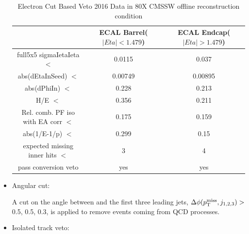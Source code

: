 \begin{itemize}
\begin{table}[htbp]
\fontsize{10 pt}{1.2 em}
\selectfont
\begin{centering}
\caption{\label{tab:ElectronCutBasedVeto} Electron Cut Based Veto 2016 Data in 80X CMSSW offline reconstruction condition}
\hspace*{-4ex}
\begin{lrbox}{\closureBox}
\begin{tabular}{|c|c|c|}
\hline
                                     & ECAL Barrel($|Eta|<1.479$) & ECAL Endcap($|Eta|>1.479$) \\
\hline
  full5x5 sigmaIetaIeta $<$          & 0.0115                     & 0.037                    \\
\hline
  abs(dEtaInSeed) $<$                & 0.00749                    & 0.00895                  \\
\hline
  abs(dPhiIn) $<$	             & 0.228                      & 0.213                    \\
\hline
  H/E $<$	                     & 0.356                      & 0.211                    \\
\hline
  Rel. comb. PF iso with EA corr $<$ & 0.175                      & 0.159                    \\
\hline
  abs(1/E-1/p) $<$                   & 0.299                      & 0.15                     \\
\hline
  expected missing inner hits $<$    & 3                          & 4                        \\
\hline
  pass conversion veto               & yes                        & yes                      \\
\hline
\end{tabular}
\end{lrbox}
\scalebox{0.80}{\usebox{\closureBox}}
\par\end{centering}
\end{table}

\item Angular cut:

A cut on the angle between \MET and the first three leading jets, 
$\Delta\phi(p^{\rm miss}_{\rm T}, j_{1,2,3})>$ 0.5, 0.5, 0.3, is applied to remove 
events coming from QCD processes.

\item Isolated track veto:


\end{itemize}
